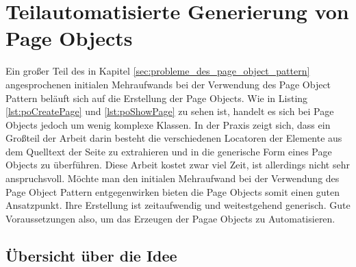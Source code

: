 
\chapter{Teilautomatisierte Generierung von Page Objects}
\label{sec:teilautomatisierte_generierung_von_pageObjects}

Ein großer Teil des in Kapitel \ref{sec:probleme_des_page_object_pattern} angesprochenen initialen Mehraufwands bei der Verwendung des Page Object Pattern beläuft sich auf die Erstellung der Page Objects.
Wie in Listing \ref{lst:poCreatePage} und \ref{lst:poShowPage} zu sehen ist, handelt es sich bei Page Objects jedoch um wenig komplexe Klassen. In der Praxis zeigt sich, dass ein Großteil der Arbeit darin besteht die verschiedenen Locatoren der Elemente aus dem Quelltext der Seite zu extrahieren und in die generische Form eines Page Objects zu überführen.
Diese Arbeit kostet zwar viel Zeit, ist allerdings nicht sehr anspruchsvoll.
Möchte man den initialen Mehraufwand bei der Verwendung des Page Object Pattern entgegenwirken bieten die Page Objects somit einen guten Ansatzpunkt.
Ihre Erstellung ist zeitaufwendig und weitestgehend generisch. Gute Voraussetzungen also, um das Erzeugen der Pagae Objects zu Automatisieren.
\section{Übersicht über die Idee}
\label{sec:uebersicht_ueber_idee}


